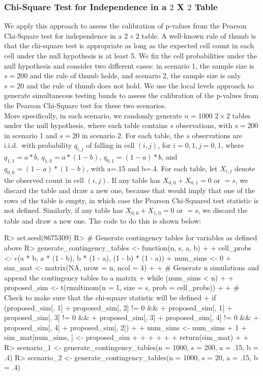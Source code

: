 \documentclass[article]{jss}
\begin{document}
\subsubsection{Chi-Square Test for Independence in a $2$ X $2$ Table}
We apply this approach to assess the calibration of p-values from the Pearson Chi-Square test for independence in a $2 \times 2$ table.  A well-known rule of thumb is that the chi-square test is appropriate as long as the expected cell count in each cell under the null hypothesis is at least 5.  We fix the cell probabilities under the null hypothesis and consider two different cases: in scenario 1, the sample size is $s=200$ and the rule of thumb holds, and scenario 2, the sample size is only $s=20$ and the rule of thumb does not hold.  We use the local levels approach to generate simultaneous testing bands to assess the calibration of the p-values from the Pearson Chi-Square test for these two scenarios.\\

More specifically, in each scenario, we randomly generate $n=1000$ $2 \times 2$ tables under the null hypothesis, where each table contains $s$ observations, with $s=200$ in scenario 1 and $s=20$ in scenario 2.  For each table, the $s$ observations are i.i.d.\ with probability $q_{i,j}$ of falling in cell $(i,j)$, for $i=0,1, j=0,1$, where $q_{1,1} = a*b$, $q_{1,0} = a*(1-b)$, $q_{0,1} = (1-a)*b$, and $q_{0,0} = (1-a)*(1-b)$, with a=.15 and b=.4.  For each table, let $X_{i,j}$ denote the observed count in cell $(i,j)$.  If any table has $X_{0,0}+X_{0,1} = 0$ or $= s$, we discard the table and draw a new one, because that would imply that one of the rows of the table is empty, in which case the Pearson Chi-Squared test statistic is not defined.  Similarly, if any table has $X_{0,0}+X_{1,0} = 0$ or $=s$, we discard the table and draw a new one. The code to do this is shown below:
%
\begin{Schunk}
\begin{Sinput}
R> set.seed(8675309)
R> # Generate contingency tables for variables as defined above
R> generate_contingency_tables <- function(n, s, a, b) {
+    
+    cell_probs <- c(a * b, a * (1 - b), b * (1 - a), (1 - b) * (1 - a))
+    num_sims <- 0
+    sim_mat <- matrix(NA, nrow = n, ncol = 4)
+    
+    # Generate n simulations and append the contingency tables to a matrix
+    while (num_sims < n) {
+      
+      proposed_sim <- t(rmultinom(n = 1, size = s, prob = cell_probs))
+      
+      # Check to make sure that the chi-square statistic will be defined
+      if (proposed_sim[, 1] + proposed_sim[, 2] != 0 && 
+          proposed_sim[, 1] + proposed_sim[, 3] != 0 &&
+          proposed_sim[, 3] + proposed_sim[, 4] != 0 &&
+          proposed_sim[, 4] + proposed_sim[, 2]) {
+        
+        num_sims <- num_sims + 1
+        sim_mat[num_sims, ] <- proposed_sim
+        
+      }
+      
+    }
+    
+    return(sim_mat)
+    
+  }
R> scenario_1 <- generate_contingency_tables(n = 1000, s = 200, a = .15, b = .4)
R> scenario_2 <- generate_contingency_tables(n = 1000, s = 20, a = .15, b = .4)
\end{Sinput}
\end{Schunk}
%
\end{document}
